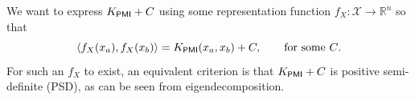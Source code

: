 





We want to express $K_\mathsf{PMI} + C$ using some representation function $f_X \colon \mathcal{X} \rightarrow \mathbb{R}^n$ so that \begin{equation}
    \langle f_X(x_a), f_X(x_b) \rangle = K_\mathsf{PMI}(x_a, x_b) + C, \qquad\text{for some $C$.}
\end{equation}For such an $f_X$ to exist, an equivalent criterion is that $K_\mathsf{PMI} + C$ is positive semi-definite (PSD), as can be seen from eigendecomposition.

